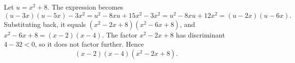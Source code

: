 Let $u=x^2+8$. The expression becomes
\[(u-3x)(u-5x)-3x^2=u^2-8xu+15x^2-3x^2=u^2-8xu+12x^2=(u-2x)(u-6x).\]
Substituting back, it equals $\left(x^2-2x+8\right)\left(x^2-6x+8\right)$, and $x^2-6x+8=(x-2)(x-4)$. The factor $x^2-2x+8$ has discriminant $4-32<0$, so it does not factor further. Hence
\[\boxed{(x-2)(x-4)\left(x^2-2x+8\right)}.\]
